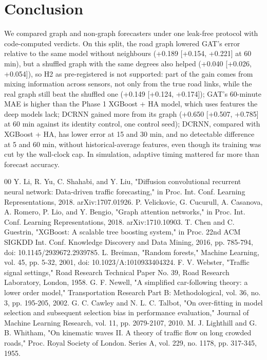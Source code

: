 \documentclass[conference]{IEEEtran}
\begin{document}
\section{Conclusion}
We compared graph and non-graph forecasters under one leak-free protocol with code-computed verdicts. On this split, the road graph lowered GAT's error relative to the same model without neighbours (+0.189 [+0.154, +0.221] at 60 min), but a shuffled graph with the same degrees also helped (+0.040 [+0.026, +0.054]), so H2 as pre-registered is not supported: part of the gain comes from mixing information across sensors, not only from the true road links, while the real graph still beat the shuffled one (+0.149 [+0.124, +0.174]); GAT's 60-minute MAE is higher than the Phase 1 XGBoost + HA model, which uses features the deep models lack; DCRNN gained more from its graph (+0.650 [+0.507, +0.785] at 60 min against its identity control, one control seed); DCRNN, compared with XGBoost + HA, has lower error at 15 and 30 min, and no detectable difference at 5 and 60 min, without historical-average features, even though its training was cut by the wall-clock cap. In simulation, adaptive timing mattered far more than forecast accuracy.

\begin{thebibliography}{00}
 Y. Li, R. Yu, C. Shahabi, and Y. Liu, "Diffusion convolutional recurrent neural network: Data-driven traffic forecasting," in Proc. Int. Conf. Learning Representations, 2018. arXiv:1707.01926.
 P. Velickovic, G. Cucurull, A. Casanova, A. Romero, P. Lio, and Y. Bengio, "Graph attention networks," in Proc. Int. Conf. Learning Representations, 2018. arXiv:1710.10903.
 T. Chen and C. Guestrin, "XGBoost: A scalable tree boosting system," in Proc. 22nd ACM SIGKDD Int. Conf. Knowledge Discovery and Data Mining, 2016, pp. 785-794, doi: 10.1145/2939672.2939785.
 L. Breiman, "Random forests," Machine Learning, vol. 45, pp. 5-32, 2001, doi: 10.1023/A:1010933404324.
 F. V. Webster, "Traffic signal settings," Road Research Technical Paper No. 39, Road Research Laboratory, London, 1958.
 G. F. Newell, "A simplified car-following theory: a lower order model," Transportation Research Part B: Methodological, vol. 36, no. 3, pp. 195-205, 2002.
 G. C. Cawley and N. L. C. Talbot, "On over-fitting in model selection and subsequent selection bias in performance evaluation," Journal of Machine Learning Research, vol. 11, pp. 2079-2107, 2010.
 M. J. Lighthill and G. B. Whitham, "On kinematic waves II. A theory of traffic flow on long crowded roads," Proc. Royal Society of London. Series A, vol. 229, no. 1178, pp. 317-345, 1955.
\end{thebibliography}
\end{document}
